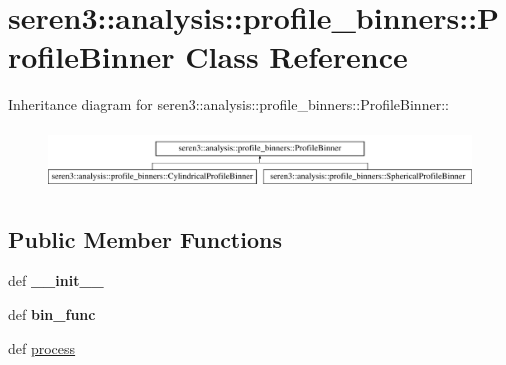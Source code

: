 \hypertarget{classseren3_1_1analysis_1_1profile__binners_1_1ProfileBinner}{
\section{seren3::analysis::profile\_\-binners::ProfileBinner Class Reference}
\label{classseren3_1_1analysis_1_1profile__binners_1_1ProfileBinner}
}
Inheritance diagram for seren3::analysis::profile\_\-binners::ProfileBinner::\begin{figure}[H]
\begin{center}
\leavevmode
\includegraphics[height=1.63265cm]{classseren3_1_1analysis_1_1profile__binners_1_1ProfileBinner}
\end{center}
\end{figure}
\subsection*{Public Member Functions}
\begin{DoxyCompactItemize}
\item 
\hypertarget{classseren3_1_1analysis_1_1profile__binners_1_1ProfileBinner_a35fea3c4f84460b4c26e266eb11839f4}{
def {\bfseries \_\-\_\-init\_\-\_\-}}
\label{classseren3_1_1analysis_1_1profile__binners_1_1ProfileBinner_a35fea3c4f84460b4c26e266eb11839f4}

\item 
\hypertarget{classseren3_1_1analysis_1_1profile__binners_1_1ProfileBinner_a99c252c4a17e20df732e8a6f5a71aaaa}{
def {\bfseries bin\_\-func}}
\label{classseren3_1_1analysis_1_1profile__binners_1_1ProfileBinner_a99c252c4a17e20df732e8a6f5a71aaaa}

\item 
def \hyperlink{classseren3_1_1analysis_1_1profile__binners_1_1ProfileBinner_a69d316ad2106ccc34416d18f8dbcdac6}{process}
\end{DoxyCompactItemize}
